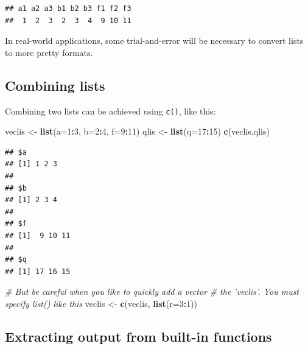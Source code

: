 \documentclass[]{book}
\newenvironment{Shaded}{\begin{snugshade}}{\end{snugshade}}
\newcommand{\CommentTok}[1]{\textcolor[rgb]{0.56,0.35,0.01}{\textit{#1}}}
\newcommand{\DataTypeTok}[1]{\textcolor[rgb]{0.13,0.29,0.53}{#1}}
\newcommand{\DecValTok}[1]{\textcolor[rgb]{0.00,0.00,0.81}{#1}}
\newcommand{\KeywordTok}[1]{\textcolor[rgb]{0.13,0.29,0.53}{\textbf{#1}}}
\newcommand{\NormalTok}[1]{#1}
\newcommand{\OperatorTok}[1]{\textcolor[rgb]{0.81,0.36,0.00}{\textbf{#1}}}
\newcommand{\StringTok}[1]{\textcolor[rgb]{0.31,0.60,0.02}{#1}}
\begin{document}
\begin{verbatim}
## a1 a2 a3 b1 b2 b3 f1 f2 f3 
##  1  2  3  2  3  4  9 10 11
\end{verbatim}

In real-world applications, some trial-and-error will be necessary to convert lists to more pretty formats.

\hypertarget{combining-lists}{%
\subsection{Combining lists}\label{combining-lists}}

Combining two lists can be achieved using \texttt{c()}, like this:

\begin{Shaded}
\begin{Highlighting}[]
\NormalTok{veclis <-}\StringTok{ }\KeywordTok{list}\NormalTok{(}\DataTypeTok{a=}\DecValTok{1}\OperatorTok{:}\DecValTok{3}\NormalTok{, }\DataTypeTok{b=}\DecValTok{2}\OperatorTok{:}\DecValTok{4}\NormalTok{, }\DataTypeTok{f=}\DecValTok{9}\OperatorTok{:}\DecValTok{11}\NormalTok{)}
\NormalTok{qlis <-}\StringTok{ }\KeywordTok{list}\NormalTok{(}\DataTypeTok{q=}\DecValTok{17}\OperatorTok{:}\DecValTok{15}\NormalTok{)}
\KeywordTok{c}\NormalTok{(veclis,qlis)}
\end{Highlighting}
\end{Shaded}

\begin{verbatim}
## $a
## [1] 1 2 3
## 
## $b
## [1] 2 3 4
## 
## $f
## [1]  9 10 11
## 
## $q
## [1] 17 16 15
\end{verbatim}

\begin{Shaded}
\begin{Highlighting}[]
\CommentTok{# But be careful when you like to quickly add a vector}
\CommentTok{# the 'veclis'. You must specify list() like this}
\NormalTok{veclis <-}\StringTok{ }\KeywordTok{c}\NormalTok{(veclis, }\KeywordTok{list}\NormalTok{(}\DataTypeTok{r=}\DecValTok{3}\OperatorTok{:}\DecValTok{1}\NormalTok{))}
\end{Highlighting}
\end{Shaded}

\hypertarget{extracting-output-from-built-in-functions}{%
\subsection{Extracting output from built-in functions}\label{extracting-output-from-built-in-functions}}
\end{document}
